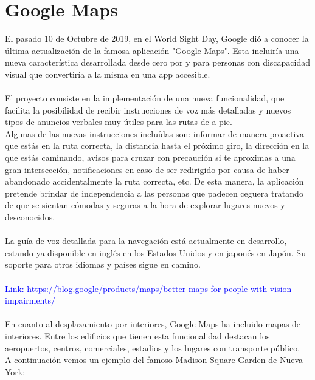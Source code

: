 \documentclass{article}
\begin{document}
	\section{Google Maps}
		El pasado 10 de Octubre de 2019, en el World Sight Day, Google dió a conocer la última actualización de la famosa aplicación "Google Maps". Esta incluiría una nueva característica desarrollada desde cero por y para personas con discapacidad visual que convertiría a la misma en una app accesible.
		\\
		\\
		El proyecto consiste en la implementación de una nueva funcionalidad, que facilita la posibilidad de recibir instrucciones de voz más detalladas y nuevos tipos de anuncios verbales muy útiles para las rutas de a pie.
		\\
		Algunas de las nuevas instrucciones incluídas son: informar de manera proactiva que estás en la ruta correcta, la distancia hasta el próximo giro, la dirección en la que estás caminando, avisos para cruzar con precaución si te aproximas a una gran intersección, notificaciones en caso de ser redirigido por causa de haber abandonado accidentalmente la ruta correcta, etc. De esta manera, la aplicación pretende brindar de independencia a las personas que padecen ceguera tratando de que se sientan cómodas y seguras a la hora de explorar lugares nuevos y desconocidos.
		\\
		\\
		La guía de voz detallada para la navegación está actualmente en desarrollo, estando ya disponible en inglés en los Estados Unidos y en japonés en Japón. Su soporte para otros idiomas y países sigue en camino.
		\\
		\\
		\textcolor{blue}{Link: https://blog.google/products/maps/better-maps-for-people-with-vision-impairments/}
		\\
		\\
		En cuanto al desplazamiento por interiores, Google Maps ha incluido mapas de interiores. Entre los edificios que tienen esta funcionalidad destacan los aeropuertos, centros, comerciales, estadios y los lugares con transporte público. 
		\\
		A continuación vemos un ejemplo del famoso Madison Square Garden de Nueva York: 
		
\end{document}
